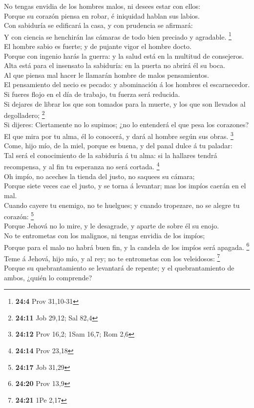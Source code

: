  No tengas envidia de los hombres malos, ni desees estar con
ellos:\\
 Porque su corazón piensa en robar, é iniquidad hablan sus
labios.\\
 Con sabiduría se edificará la casa, y con prudencia se
afirmará:\\
 Y con ciencia se henchirán las cámaras de todo bien
preciado y agradable. \footnote{\textbf{24:4} Prov 31,10-31}\\
 El hombre sabio es fuerte; y de pujante vigor el hombre
docto.\\
 Porque con ingenio harás la guerra: y la salud está en la
multitud de consejeros.\\
 Alta está para el insensato la sabiduría: en la puerta no
abrirá él su boca.\\
 Al que piensa mal hacer le llamarán hombre de malos
pensamientos.\\
 El pensamiento del necio es pecado: y abominación á los
hombres el escarnecedor.\\
 Si fueres flojo en el día de trabajo, tu fuerza será
reducida.\\
 Si dejares de librar los que son tomados para la muerte, y
los que son llevados al degolladero; \footnote{\textbf{24:11} Job 29,12;
  Sal 82,4}\\
 Si dijeres: Ciertamente no lo supimos; ¿no lo entenderá el
que pesa los corazones? El que mira por tu alma, él lo conocerá, y dará
al hombre según sus obras. \footnote{\textbf{24:12} Prov 16,2; 1Sam
  16,7; Rom 2,6}\\
 Come, hijo mío, de la miel, porque es buena, y del panal
dulce á tu paladar:\\
 Tal será el conocimiento de la sabiduría á tu alma: si la
hallares tendrá recompensa, y al fin tu esperanza no será cortada.
\footnote{\textbf{24:14} Prov 23,18}\\
 Oh impío, no aceches la tienda del justo, no saquees su
cámara;\\
 Porque siete veces cae el justo, y se torna á levantar;
mas los impíos caerán en el mal.\\
 Cuando cayere tu enemigo, no te huelgues; y cuando
tropezare, no se alegre tu corazón: \footnote{\textbf{24:17} Job 31,29}\\
 Porque Jehová no lo mire, y le desagrade, y aparte de
sobre él su enojo.\\
 No te entrometas con los malignos, ni tengas envidia de
los impíos;\\
 Porque para el malo no habrá buen fin, y la candela de los
impíos será apagada. \footnote{\textbf{24:20} Prov 13,9}\\
 Teme á Jehová, hijo mío, y al rey; no te entrometas con
los veleidosos: \footnote{\textbf{24:21} 1Pe 2,17}\\
 Porque su quebrantamiento se levantará de repente; y el
quebrantamiento de ambos, ¿quién lo comprende?

